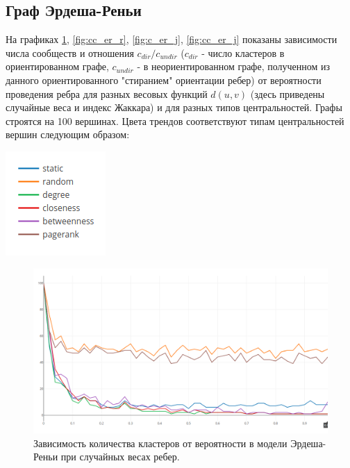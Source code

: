 \subsection{Граф Эрдеша-Реньи}
На графиках \ref{fig:c_er_r}, \ref{fig:cc_er_r}, \ref{fig:c_er_j}, \ref{fig:cc_er_j} показаны зависимости числа сообществ и отношения $c_{dir}/c_{undir}$ ($c_{dir}$ - число кластеров в ориентированном графе, $c_{undir}$ - в неориентированном графе, полученном из данного ориентированного "стиранием" ориентации ребер) от вероятности проведения ребра для разных весовых функций $d(u, v)$ (здесь приведены случайные веса и индекс Жаккара) и для разных типов центральностей. Графы строятся на 100 вершинах. Цвета трендов соответствуют типам центральностей вершин следующим образом:

\begin{center}
	\includegraphics[scale=0.78]{pics/colormap.png}
\end{center}

	\begin{figure}
		\centering
		\includegraphics[width=\textwidth]{pics/random_count.png}
		\caption{Зависимость количества кластеров от вероятности в модели Эрдеша-Реньи при случайных весах ребер.}
		\label{fig:c_er_r}
	\end{figure}
	

